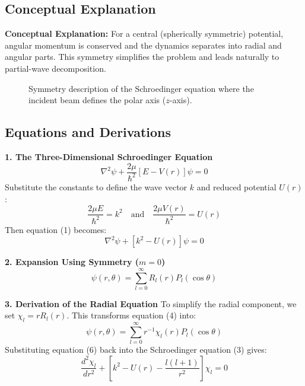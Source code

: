 \documentclass[12pt]{report}
\begin{document}
\subsection{Conceptual Explanation}
\textbf{Conceptual Explanation:} For a central (spherically symmetric) potential, angular momentum is conserved and the dynamics separates into radial and angular parts. This symmetry simplifies the problem and leads naturally to partial-wave decomposition.


\begin{figure}[H]
    \centering
    
    \caption{Symmetry description of the Schroedinger equation where the incident beam defines the polar axis ($z$-axis).}
\end{figure}

\subsection*{Equations and Derivations}

\textbf{1. The Three-Dimensional Schroedinger Equation}
\begin{equation}
\nabla^2 \psi + \frac{2\mu}{\hbar^2} [E - V(r)] \psi = 0
\end{equation}
Substitute the constants to define the wave vector $k$ and reduced potential $U(r)$:
\begin{equation}
\frac{2\mu E}{\hbar^2} = k^2 \quad \text{and} \quad \frac{2\mu V(r)}{\hbar^2} = U(r)
\end{equation}
Then equation (1) becomes:
\begin{equation}
\nabla^2 \psi + [k^2 - U(r)] \psi = 0
\end{equation}

\textbf{2. Expansion Using Symmetry ($m=0$)}
\begin{equation}
\psi(r, \theta) = \sum_{l=0}^{\infty} R_l(r) P_l(\cos \theta)
\end{equation}

\textbf{3. Derivation of the Radial Equation} To simplify the radial component, we set $\chi_l = r R_l(r)$. This transforms equation (4) into:
\begin{equation}
\psi(r, \theta) = \sum_{l=0}^{\infty} r^{-1} \chi_l(r) P_l(\cos \theta)
\end{equation}
Substituting equation (6) back into the Schroedinger equation (3) gives:
\begin{equation}
\frac{d^2 \chi_l}{dr^2} + \left[ k^2 - U(r) - \frac{l(l+1)}{r^2} \right] \chi_l = 0
\end{equation}
\end{document}
